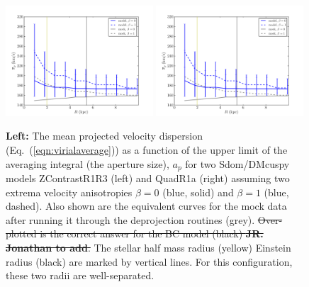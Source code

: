 \documentclass[galley,usenatbib]{mn2e}
\newcommand{\eqnref}[1] {Eq.~(\ref{#1})}
\begin{document}
\begin{figure}
\includegraphics[width=0.49\textwidth]{BCQuadR1a_TmS_sigpbar.pdf}
\includegraphics[width=0.49\textwidth]{BCQuadR1a_TmS_sigpbar.pdf}
\caption{{\bf Left:} 
The mean projected velocity dispersion (\eqnref{eqn:virialaverage}) as a function of the upper
limit of the averaging integral (the aperture size), $a_p$
  for two Sdom/DMcuspy models ZContrastR1R3
  (left) and QuadR1a (right) assuming two extrema velocity anisotropies $\beta=0$ (blue, solid) and $\beta=1$
  (blue, dashed).  Also shown are the equivalent curves for the mock data after
  running it through the deprojection routines (grey). 
\sout{Over-plotted is the correct answer for the BC model (black)
  {\bf JR. Jonathan to add}.} 
  The stellar half mass radius (yellow) Einstein
radius (black) are marked by vertical lines. For this configuration, these two
radii are well-separated.}
\label{sigma-beta}
\end{figure}

%
\end{document}
